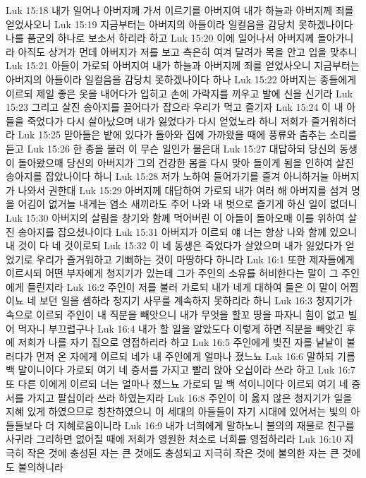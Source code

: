Luk 15:18  내가 일어나 아버지께 가서 이르기를 아버지여 내가 하늘과 아버지께 죄를 얻었사오니
Luk 15:19  지금부터는 아버지의 아들이라 일컬음을 감당치 못하겠나이다 나를 품군의 하나로 보소서 하리라 하고
Luk 15:20  이에 일어나서 아버지께 돌아가니라 아직도 상거가 먼데 아버지가 저를 보고 측은히 여겨 달려가 목을 안고 입을 맞추니
Luk 15:21  아들이 가로되 아버지여 내가 하늘과 아버지께 죄를 얻었사오니 지금부터는 아버지의 아들이라 일컬음을 감당치 못하겠나이다 하나
Luk 15:22  아버지는 종들에게 이르되 제일 좋은 옷을 내어다가 입히고 손에 가락지를 끼우고 발에 신을 신기라
Luk 15:23  그리고 살진 송아지를 끌어다가 잡으라 우리가 먹고 즐기자
Luk 15:24  이 내 아들을 죽었다가 다시 살아났으며 내가 잃었다가 다시 얻었노라 하니 저희가 즐거워하더라
Luk 15:25  맏아들은 밭에 있다가 돌아와 집에 가까왔을 때에 풍류와 춤추는 소리를 듣고
Luk 15:26  한 종을 불러 이 무슨 일인가 물은대
Luk 15:27  대답하되 당신의 동생이 돌아왔으매 당신의 아버지가 그의 건강한 몸을 다시 맞아 들이게 됨을 인하여 살진 송아지를 잡았나이다 하니
Luk 15:28  저가 노하여 들어가기를 즐겨 아니하거늘 아버지가 나와서 권한대
Luk 15:29  아버지께 대답하여 가로되 내가 여러 해 아버지를 섬겨 명을 어김이 없거늘 내게는 염소 새끼라도 주어 나와 내 벗으로 즐기게 하신 일이 없더니
Luk 15:30  아버지의 살림을 창기와 함께 먹어버린 이 아들이 돌아오매 이를 위하여 살진 송아지를 잡으셨나이다
Luk 15:31  아버지가 이르되 얘 너는 항상 나와 함께 있으니 내 것이 다 네 것이로되
Luk 15:32  이 네 동생은 죽었다가 살았으며 내가 잃었다가 얻었기로 우리가 즐거워하고 기뻐하는 것이 마땅하다 하니라
Luk 16:1  또한 제자들에게 이르시되 어떤 부자에게 청지기가 있는데 그가 주인의 소유를 허비한다는 말이 그 주인에게 들린지라
Luk 16:2  주인이 저를 불러 가로되 내가 네게 대하여 들은 이 말이 어찜이뇨 네 보던 일을 셈하라 청지기 사무를 계속하지 못하리라 하니
Luk 16:3  청지기가 속으로 이르되 주인이 내 직분을 빼앗으니 내가 무엇을 할꼬 땅을 파자니 힘이 없고 빌어 먹자니 부끄럽구나
Luk 16:4  내가 할 일을 알았도다 이렇게 하면 직분을 빼앗긴 후에 저희가 나를 자기 집으로 영접하리라 하고
Luk 16:5  주인에게 빚진 자를 낱낱이 불러다가 먼저 온 자에게 이르되 네가 내 주인에게 얼마나 졌느뇨
Luk 16:6  말하되 기름 백 말이니이다 가로되 여기 네 증서를 가지고 빨리 앉아 오십이라 쓰라 하고
Luk 16:7  또 다른 이에게 이르되 너는 얼마나 졌느뇨 가로되 밀 백 석이니이다 이르되 여기 네 증서를 가지고 팔십이라 쓰라 하였는지라
Luk 16:8  주인이 이 옳지 않은 청지기가 일을 지혜 있게 하였으므로 칭찬하였으니 이 세대의 아들들이 자기 시대에 있어서는 빛의 아들들보다 더 지혜로움이니라
Luk 16:9  내가 너희에게 말하노니 불의의 재물로 친구를 사귀라 그리하면 없어질 때에 저희가 영원한 처소로 너희를 영접하리라
Luk 16:10  지극히 작은 것에 충성된 자는 큰 것에도 충성되고 지극히 작은 것에 불의한 자는 큰 것에도 불의하니라

